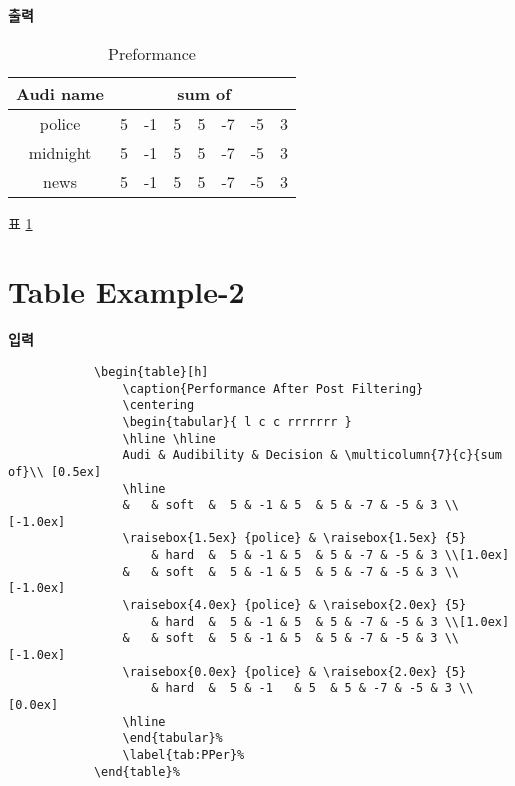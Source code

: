 \documentclass[12pt,a4paper]{report}
\begin{document}
		\textbf{출력}\\
		\vspace{-2.0em}
				\begin{table}[h]
					\caption{Preformance}
					\centering
				    \begin{tabular}{c rrrrrrr }
				    \hline \hline
					Audi name & \multicolumn{7}{c}{ sum of }  \\ [0.5ex]
				    \hline
				    police   	& 5 & -1 & 5  & 5 & -7 & -5 & 3 \\
				    midnight 	& 5 & -1 & 5  & 5 & -7 & -5 & 3 \\
				    news   	& 5 & -1 & 5  & 5 & -7 & -5 & 3 \\
				    \hline
				    \end{tabular}%
				  \label{table:hresult}%
				\end{table}%
				
	표 \ref{table:hresult}
	\doublespacing
		

\newpage 
\section{Table Example-2}
\null

	\singlespacing
	\textbf{입력}\\
		\begin{boxedminipage}[t]{1.0\linewidth}
		\small
		\begin{verbatim}	
			\begin{table}[h]
				\caption{Performance After Post Filtering}
				\centering
				\begin{tabular}{ l c c rrrrrrr }
				\hline \hline
				Audi & Audibility & Decision & \multicolumn{7}{c}{sum of}\\ [0.5ex]
				\hline
				& 	& soft 	&  5 & -1 & 5  & 5 & -7 & -5 & 3 \\[-1.0ex]
				\raisebox{1.5ex} {police} & \raisebox{1.5ex} {5} 
					& hard	&  5 & -1 & 5  & 5 & -7 & -5 & 3 \\[1.0ex]
				& 	& soft 	&  5 & -1 & 5  & 5 & -7 & -5 & 3 \\[-1.0ex]
				\raisebox{4.0ex} {police} & \raisebox{2.0ex} {5} 
					& hard	&  5 & -1 & 5  & 5 & -7 & -5 & 3 \\[1.0ex]
				& 	& soft 	&  5 & -1 & 5  & 5 & -7 & -5 & 3 \\[-1.0ex]
				\raisebox{0.0ex} {police} & \raisebox{2.0ex} {5} 
					& hard	&  5 & -1 	& 5  & 5 & -7 & -5 & 3 \\[0.0ex]
				\hline
				\end{tabular}%
				\label{tab:PPer}%
			\end{table}%
		\end{verbatim} 
		\end{boxedminipage} \\ \\
\end{document}
